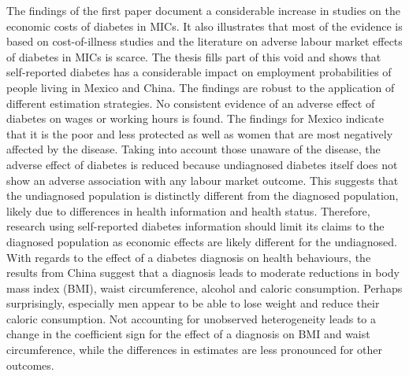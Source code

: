 The findings of the first paper document a considerable increase in studies on the economic costs of diabetes in \acp{MIC}. It also illustrates that most of the evidence is based on cost-of-illness studies and the literature on adverse labour market effects of diabetes in \acp{MIC} is scarce. The thesis fills part of this void and shows that self-reported diabetes has a considerable impact on employment probabilities of people living in Mexico and China. The findings are robust to the application of different estimation strategies. No consistent evidence of an adverse effect of diabetes on wages or working hours is found. The findings for Mexico indicate that it is the poor and less protected as well as women that are most negatively affected by the disease. Taking into account those unaware of the disease, the adverse effect of diabetes is reduced because undiagnosed diabetes itself does not show an adverse association with any labour market outcome. This suggests that the undiagnosed population is distinctly different from the diagnosed population, likely due to differences in health information and health status. Therefore, research using self-reported diabetes information should limit its claims to the diagnosed population as economic effects are likely different for the undiagnosed. With regards to the effect of a diabetes diagnosis on health behaviours, the results from China suggest that a diagnosis leads to moderate reductions in body mass index (BMI), waist circumference, alcohol and caloric consumption. Perhaps surprisingly, especially men appear to be able to lose weight and reduce their caloric consumption. Not accounting for unobserved heterogeneity leads to a change in the coefficient sign for the effect of a diagnosis on BMI and waist circumference, while the differences in estimates are less pronounced for other outcomes.



